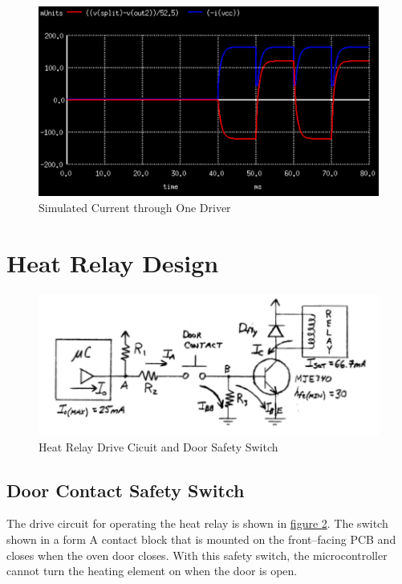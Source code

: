 \documentclass[10pt, twocolumn]{article}
\begin{document}
\begin{figure}
	\centering
	\includegraphics[width=0.9\columnwidth]{Figures/motor-driver-current-simulation.pdf}
	\caption{Simulated Current through One Driver}
	\label{motor-driver-current-simulation}
\end{figure}

\section{Heat Relay Design}

\begin{figure}
	\centering
	\includegraphics[width=\columnwidth]{Figures/relay-drive-circuit.pdf}
	\caption{Heat Relay Drive Cicuit and Door Safety Switch}
	\label{relay-drive-circuit}
\end{figure}

\subsection{Door Contact Safety Switch}

The drive circuit for operating the heat relay is shown in
\hyperref[relay-drive-circuit]{figure \ref{relay-drive-circuit}}.
The switch shown in a form A contact block that is mounted on the front--facing PCB
and closes when the oven door closes. With this safety switch,
the microcontroller cannot turn the heating element on when the door is open.
\end{document}
